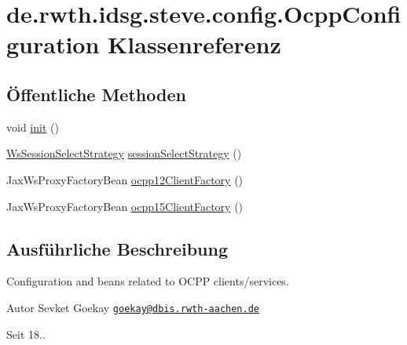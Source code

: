 \hypertarget{classde_1_1rwth_1_1idsg_1_1steve_1_1config_1_1_ocpp_configuration}{\section{de.\-rwth.\-idsg.\-steve.\-config.\-Ocpp\-Configuration Klassenreferenz}
\label{classde_1_1rwth_1_1idsg_1_1steve_1_1config_1_1_ocpp_configuration}
}
\subsection*{Öffentliche Methoden}
\begin{DoxyCompactItemize}
\item 
void \hyperlink{classde_1_1rwth_1_1idsg_1_1steve_1_1config_1_1_ocpp_configuration_a65c213e626583e41d19729ccae283b24}{init} ()
\item 
\hyperlink{interfacede_1_1rwth_1_1idsg_1_1steve_1_1ocpp_1_1ws_1_1custom_1_1_ws_session_select_strategy}{Ws\-Session\-Select\-Strategy} \hyperlink{classde_1_1rwth_1_1idsg_1_1steve_1_1config_1_1_ocpp_configuration_a2215247b3b46ee4cd066103e62954322}{session\-Select\-Strategy} ()
\item 
Jax\-Ws\-Proxy\-Factory\-Bean \hyperlink{classde_1_1rwth_1_1idsg_1_1steve_1_1config_1_1_ocpp_configuration_a9e78038c009343509aedcc9637866090}{ocpp12\-Client\-Factory} ()
\item 
Jax\-Ws\-Proxy\-Factory\-Bean \hyperlink{classde_1_1rwth_1_1idsg_1_1steve_1_1config_1_1_ocpp_configuration_ad05a2cd4a56c41d5b17146e01d1338f4}{ocpp15\-Client\-Factory} ()
\end{DoxyCompactItemize}


\subsection{Ausführliche Beschreibung}
Configuration and beans related to O\-C\-P\-P clients/services.

\begin{DoxyAuthor}{Autor}
Sevket Goekay \href{mailto:goekay@dbis.rwth-aachen.de}{\tt goekay@dbis.\-rwth-\/aachen.\-de} 
\end{DoxyAuthor}
\begin{DoxySince}{Seit}
18.. 
\end{DoxySince}



